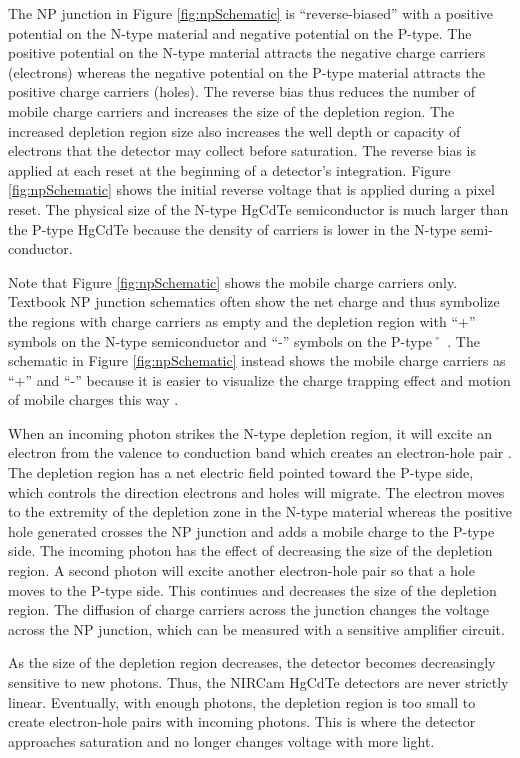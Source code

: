 \documentclass[]{aastex62}
\begin{document}
The NP junction in Figure \ref{fig:npSchematic} is ``reverse-biased'' with a positive potential on the N-type material and negative potential on the P-type.
The positive potential on the N-type material attracts the negative charge carriers (electrons) whereas the negative potential on the P-type material attracts the  positive charge carriers (holes).
The reverse bias thus reduces the number of mobile charge carriers and increases the size of the depletion region.
The increased depletion region size also increases the well depth or capacity of electrons that the detector may collect before saturation.
The reverse bias is applied at each reset at the beginning of a detector's integration.
Figure \ref{fig:npSchematic} shows the initial reverse voltage that is applied during a pixel reset. 
The physical size of the N-type HgCdTe semiconductor is much larger than the P-type HgCdTe because the density of carriers is lower in the N-type semi-conductor.

Note that Figure \ref{fig:npSchematic} shows the mobile charge carriers only.
Textbook NP junction schematics often show the net charge and thus symbolize the regions with charge carriers as empty and the depletion region with ``+'' symbols on the N-type semiconductor and ``-'' symbols on the P-type˚ \citep[e.g.][]{halliday2004physicsText}.
The schematic in Figure \ref{fig:npSchematic} instead shows the mobile charge carriers as ``+'' and ``-'' because it is easier to visualize the charge trapping effect and motion of mobile charges this way \citep[e.g.][]{smith2008imgPersistence}.

When an incoming photon strikes the N-type depletion region, it will excite an electron from the valence to conduction band which creates an electron-hole pair \citep{rieke2007irDetectorReview}.
The depletion region has a net electric field pointed toward the P-type side, which controls the direction electrons and holes will migrate.
The electron moves to the extremity of the depletion zone in the N-type material whereas the positive hole generated crosses the NP junction and adds a mobile charge to the P-type side.
The incoming photon has the effect of decreasing the size of the depletion region.
A second photon will excite another electron-hole pair so that a hole moves to the P-type side.
This continues and decreases the size of the depletion region.
The diffusion of charge carriers across the junction changes the voltage across the NP junction, which can be measured with a sensitive amplifier circuit.

As the size of the depletion region decreases, the detector becomes decreasingly sensitive to new photons.
Thus, the NIRCam HgCdTe detectors are never strictly linear.
Eventually, with enough photons, the depletion region is too small to create electron-hole pairs with incoming photons.
This is where the detector approaches saturation and no longer changes voltage with more light.
\end{document}
